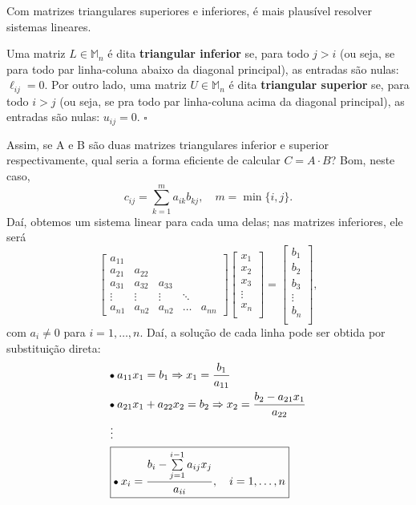 \documentclass[../numerical_methods.tex]{subfiles}
\begin{document}
Com matrizes triangulares superiores e inferiores, é mais plausível resolver sistemas lineares.
\begin{def*}
	Uma matriz \(L\in \mathbb{M}_{n}\) é dita \textbf{triangular inferior} se, para todo \(j > i \) (ou seja, se para todo par linha-coluna abaixo da diagonal principal), as entradas são nulas: \(\ell_{ij} = 0\). Por outro lado, uma matriz \(U\in \mathbb{M}_n\) é dita \textbf{triangular superior} se, para todo \(i>j\) (ou seja, se pra todo par linha-coluna acima da diagonal principal), as entradas são nulas: \(u_{ij}=0\). \(\square\)
\end{def*}

Assim, se A e B são duas matrizes triangulares inferior e superior respectivamente, qual seria a forma eficiente de calcular \(C = A \cdot B\)? Bom, neste caso,
\[
	c_{ij}=\sum\limits_{k=1}^{m}a_{ik}b_{kj}, \quad m = \min\limits_{}\{i, j\}.
\]
Daí, obtemos um sistema linear para cada uma delas; nas matrizes inferiores, ele será
\[
	\begin{bmatrix}
		a_{11} &        &        &        &        \\
		a_{21} & a_{22} &        &        &        \\
		a_{31} & a_{32} & a_{33} &        &        \\
		\vdots & \vdots & \vdots & \ddots &        \\
		a_{n1} & a_{n2} & a_{n2} & \dotsc & a_{nn}
	\end{bmatrix} \begin{bmatrix}
		x_{1}  \\
		x_{2}  \\
		x_{3}  \\
		\vdots \\
		x_{n}  \\
	\end{bmatrix} = \begin{bmatrix}
		b_{1}  \\
		b_{2}  \\
		b_{3}  \\
		\vdots \\
		b_{n}  \\
	\end{bmatrix},
\]
com \(a_{i}\neq 0\) para \(i=1,\dotsc , n.\) Daí, a solução de cada linha pode ser obtida por substituição direta:
\begin{align*}
	 & \tikz[baseline=-0.5ex]\draw[black, fill=black, radius=1.5pt](0, 0)circle;\; a_{11}x_1= b_1 \Rightarrow x_1 = \frac{b_1}{a_{11}}                                         \\
	 & \tikz[baseline=-0.5ex]\draw[black, fill=black, radius=1.5pt](0, 0)circle;\; a_{21}x_1 + a_{22}x_2=b_2 \Rightarrow x_{2}=\frac{b_{2}-a_{21}x_1}{a_{22}}                  \\
	 & \vdots                                                                                                                                                                  \\
	 & \boxed{\tikz[baseline=-0.5ex]\draw[black, fill=black, radius=1.5pt](0, 0)circle;\; x_{i}=\frac{b_{i}-\sum\limits_{j=1}^{i-1}a_{ij}x_{j}}{a_{ii}},\quad i=1, \dotsc , n}
\end{align*}
\end{document}

